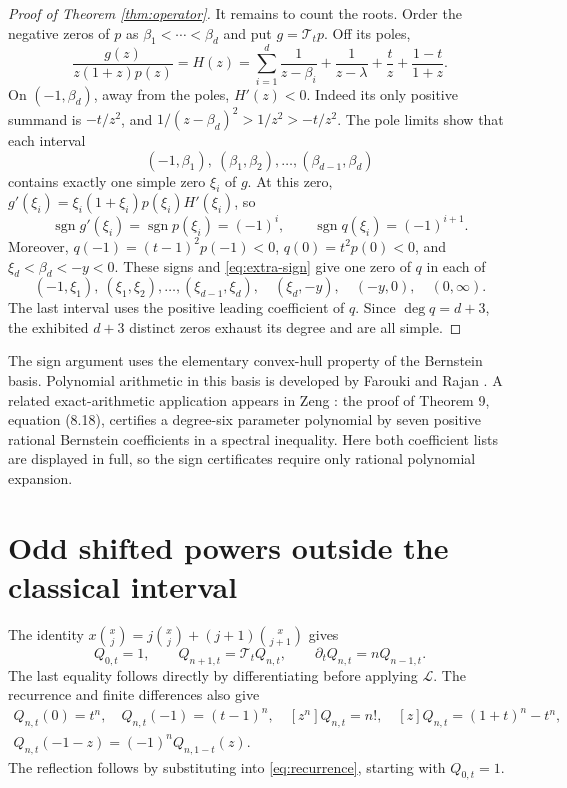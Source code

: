 \documentclass[11pt]{article}
\theoremstyle{remark}
\newcommand{\T}{\mathcal{T}}
\newcommand{\Lop}{\mathcal{L}}
\DeclareMathOperator{\sgn}{sgn}
\begin{document}
\begin{proof}[Proof of Theorem \ref{thm:operator}]
It remains to count the roots. Order the negative zeros of $p$ as
$\beta_1<\cdots<\beta_d$ and put $g=\T_t p$. Off its poles,
\begin{equation}\label{eq:H}
 \frac{g(z)}{z(1+z)p(z)}=H(z)
 =\sum_{i=1}^d\frac1{z-\beta_i}+\frac1{z-\lambda}
       +\frac t z+\frac{1-t}{1+z}.
\end{equation}
On $(-1,\beta_d)$, away from the poles, $H'(z)<0$.
Indeed its only positive summand is $-t/z^2$, and
$1/(z-\beta_d)^2>1/z^2>-t/z^2$.
The pole limits show that each interval
\[
 (-1,\beta_1),\ (\beta_1,\beta_2),\ldots,
 (\beta_{d-1},\beta_d)
\]
contains exactly one simple zero $\xi_i$ of $g$.
At this zero,
$g'(\xi_i)=\xi_i(1+\xi_i)p(\xi_i)H'(\xi_i)$, so
\[
 \sgn g'(\xi_i)=\sgn p(\xi_i)=(-1)^i,
 \qquad \sgn q(\xi_i)=(-1)^{i+1}.
\]
Moreover,
$q(-1)=(t-1)^2p(-1)<0$, $q(0)=t^2p(0)<0$, and
$\xi_d<\beta_d<-y<0$. These signs and \eqref{eq:extra-sign} give
one zero of $q$ in each of
\[
 (-1,\xi_1),\ (\xi_1,\xi_2),\ldots,(\xi_{d-1},\xi_d),\quad
 (\xi_d,-y),\quad(-y,0),\quad(0,\infty).
\]
The last interval uses the positive leading coefficient of $q$.
Since $\deg q=d+3$, the exhibited $d+3$ distinct zeros exhaust its degree
and are all simple.
\end{proof}

The sign argument uses the elementary convex-hull property of the
Bernstein basis. Polynomial arithmetic in this basis is developed by
Farouki and Rajan \cite{FaroukiRajan1988}. A related exact-arithmetic
application appears in Zeng \cite{ZengLens2026}: the proof of Theorem 9,
equation (8.18), certifies a degree-six parameter polynomial by seven
positive rational Bernstein coefficients in a spectral inequality.
Here both coefficient lists are displayed in full, so the sign certificates
require only rational polynomial expansion.

\section{Odd shifted powers outside the classical interval}

The identity
$x\binom{x}{j}=j\binom{x}{j}+(j+1)\binom{x}{j+1}$ gives
\begin{equation}\label{eq:recurrence}
 Q_{0,t}=1,\qquad Q_{n+1,t}=\T_tQ_{n,t},\qquad
 \partial_tQ_{n,t}=nQ_{n-1,t}.
\end{equation}
The last equality follows directly by differentiating before applying
$\Lop$. The recurrence and finite differences also give
\begin{gather}
 Q_{n,t}(0)=t^n,\quad Q_{n,t}(-1)=(t-1)^n,\quad
 [z^n]Q_{n,t}=n!,\quad [z]Q_{n,t}=(1+t)^n-t^n,
 \label{eq:values}\\
 Q_{n,t}(-1-z)=(-1)^nQ_{n,1-t}(z).
 \label{eq:reflection}
\end{gather}
The reflection follows by substituting into \eqref{eq:recurrence}, starting
with $Q_{0,t}=1$.
\end{document}
